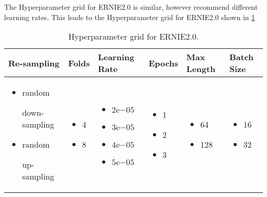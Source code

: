 The Hyperparameter grid for \ac{ERNIE2.0} is similar, however \textcite{Sun:2019a} recommend different learning rates.
This leads to the Hyperparameter grid for \ac{ERNIE2.0} shown in \cref{tab:study:execution:paramter_grid:ERNIE2.0}
\pagebreak %
\begin{table}[htpb]
    \centering
    \begin{tabular}{ p{3.5cm} p{1.5cm} p{2cm} p{1.5cm} p{1.6cm} p{1.5cm} }
        \toprule
         Re-sampling & Folds & Learning Rate & Epochs & Max Length & Batch Size \\
        \midrule
            \begin{itemize}[noitemsep,topsep=0pt,leftmargin=15pt]
                \item {random

                down-sampling}
                \item {random

                up-sampling}
            \end{itemize}
            &\begin{itemize}[noitemsep,topsep=0pt,leftmargin=15pt]
                \item 4
                \item 8
            \end{itemize}
            & \begin{itemize}[noitemsep,topsep=0pt,leftmargin=15pt]
                \item $2\mathrm{e}{-05}$
                \item $3\mathrm{e}{-05}$
                \item $4\mathrm{e}{-05}$
                \item $5\mathrm{e}{-05}$
            \end{itemize}
            & \begin{itemize}[noitemsep,topsep=0pt,leftmargin=15pt]
                \item 1
                \item 2
                \item 3
            \end{itemize}
            & \begin{itemize}[noitemsep,topsep=0pt,leftmargin=15pt]
                \item 64
                \item 128
            \end{itemize}
            & \begin{itemize}[noitemsep,topsep=0pt,leftmargin=15pt]
                \item 16
                \item 32
            \end{itemize}\\
        \bottomrule
    \end{tabular}
    \caption[Hyperparameter Grid for \ac{ERNIE2.0}]{Hyperparameter grid for \ac{ERNIE2.0}.}\label{tab:study:execution:paramter_grid:ERNIE2.0}
\end{table}

